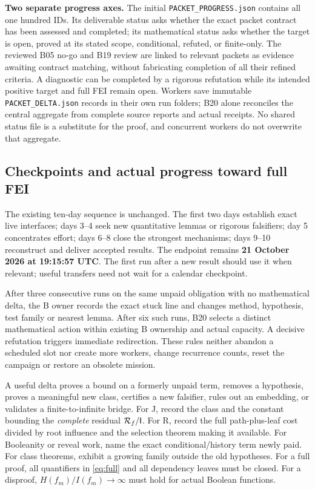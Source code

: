 \documentclass[11pt]{article}
\begin{document}
\textbf{Two separate progress axes.} The initial \texttt{PACKET\_PROGRESS.json} contains all one hundred IDs. Its deliverable status asks whether the exact packet contract has been assessed and completed; its mathematical status asks whether the target is open, proved at its stated scope, conditional, refuted, or finite-only. The reviewed B05 no-go and B19 review are linked to relevant packets as evidence awaiting contract matching, without fabricating completion of all their refined criteria. A diagnostic can be completed by a rigorous refutation while its intended positive target and full FEI remain open. Workers save immutable \texttt{PACKET\_DELTA.json} records in their own run folders; B20 alone reconciles the central aggregate from complete source reports and actual receipts. No shared status file is a substitute for the proof, and concurrent workers do not overwrite that aggregate.

\subsection{Checkpoints and actual progress toward full FEI}

The existing ten-day sequence is unchanged. The first two days establish exact live interfaces; days 3--4 seek new quantitative lemmas or rigorous falsifiers; day 5 concentrates effort; days 6--8 close the strongest mechanisms; days 9--10 reconstruct and deliver accepted results. The endpoint remains \textbf{21 October 2026 at 19:15:57 UTC}. The first run after a new result should use it when relevant; useful transfers need not wait for a calendar checkpoint.

After three consecutive runs on the same unpaid obligation with no mathematical delta, the B owner records the exact stuck line and changes method, hypothesis, test family or nearest lemma. After six such runs, B20 selects a distinct mathematical action within existing B ownership and actual capacity. A decisive refutation triggers immediate redirection. These rules neither abandon a scheduled slot nor create more workers, change recurrence counts, reset the campaign or restore an obsolete mission.

A useful delta proves a bound on a formerly unpaid term, removes a hypothesis, proves a meaningful new class, certifies a new falsifier, rules out an embedding, or validates a finite-to-infinite bridge. For J, record the class and the constant bounding the \emph{complete} residual $\mathcal R_f/\mathsf I$. For R, record the full path-plus-leaf cost divided by root influence and the selection theorem making it available. For Booleanity or reveal work, name the exact conditional/history term newly paid. For class theorems, exhibit a growing family outside the old hypotheses. For a full proof, all quantifiers in \eqref{eq:full} and all dependency leaves must be closed. For a disproof, $H(f_m)/I(f_m)\to\infty$ must hold for actual Boolean functions.
\end{document}
